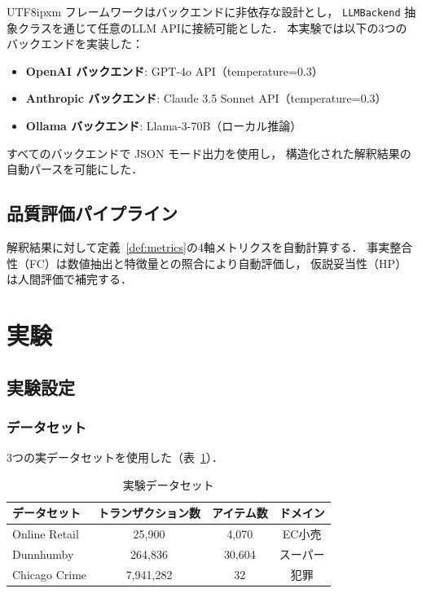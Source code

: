 \documentclass[conference]{IEEEtran}
\begin{document}
\begin{CJK}{UTF8}{ipxm}
フレームワークはバックエンドに非依存な設計とし，
\texttt{LLMBackend} 抽象クラスを通じて任意のLLM APIに接続可能とした．
本実験では以下の3つのバックエンドを実装した：
\begin{itemize}[nosep]
    \item \textbf{OpenAI バックエンド}: GPT-4o API（temperature=0.3）
    \item \textbf{Anthropic バックエンド}: Claude 3.5 Sonnet API（temperature=0.3）
    \item \textbf{Ollama バックエンド}: Llama-3-70B（ローカル推論）
\end{itemize}

すべてのバックエンドで JSON モード出力を使用し，
構造化された解釈結果の自動パースを可能にした．

\subsection{品質評価パイプライン}

解釈結果に対して定義~\ref{def:metrics}の4軸メトリクスを自動計算する．
事実整合性（FC）は数値抽出と特徴量との照合により自動評価し，
仮説妥当性（HP）は人間評価で補完する．

\section{実験}
\label{sec:experiments}

\subsection{実験設定}

\subsubsection{データセット}
3つの実データセットを使用した（表~\ref{tab:datasets}）．

\begin{table}[t]
\centering
\caption{実験データセット}
\label{tab:datasets}
\begin{tabular}{lccc}
\toprule
データセット & トランザクション数 & アイテム数 & ドメイン \\
\midrule
Online Retail & 25,900 & 4,070 & EC小売 \\
Dunnhumby     & 264,836 & 30,604 & スーパー \\
Chicago Crime & 7,941,282 & 32 & 犯罪 \\
\bottomrule
\end{tabular}
\end{table}


\end{CJK}
\end{document}
